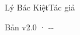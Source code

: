 \begin{titlepage}
\vfill
{\LARGE\sffamily Lý Bác Kiệt\quad Tác giả\par}
\vspace{0.7cm}
{\small\sffamily\color{structurecolor!80} Bản v2.0 · \number\year-\number\month-\number\day\par}
\vspace{1.2cm}
\end{titlepage}
